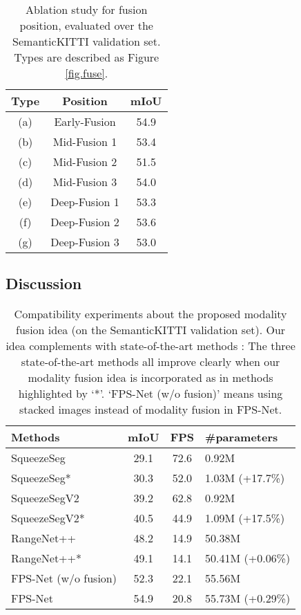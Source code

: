\documentclass[preprint,review,3p]{elsarticle}
\begin{document}
\renewcommand\arraystretch{1.0}
\begin{table}[!h]
  \caption{Ablation study for fusion position, evaluated over the SemanticKITTI validation set. Types are described as Figure \ref{fig.fuse}.} 
  \centering
  \begin{tabular}{ccc}
    \hline
    Type & Position  & mIoU\\
    \hline
    (a) & Early-Fusion & 54.9\\
    (b) & Mid-Fusion 1 & 53.4\\
    (c) & Mid-Fusion 2 & 51.5\\
    (d) & Mid-Fusion 3 & 54.0 \\
    (e) & Deep-Fusion 1 & 53.3\\
    (f) & Deep-Fusion 2 & 53.6\\
    (g) & Deep-Fusion 3 & 53.0 \\
    \hline
  \end{tabular}
  \label{tab.Ablation-fusion}
\end{table}

\subsection{Discussion}

\begin{table}[h]
  \caption{Compatibility experiments about the proposed modality fusion idea (on the SemanticKITTI validation set). Our idea complements with state-of-the-art methods : The three state-of-the-art methods all improve clearly when our modality fusion idea is incorporated as in methods highlighted by `*’. `FPS-Net (w/o fusion)' means using stacked images instead of modality fusion in FPS-Net.}
  \centering
  \begin{tabular}{lccl}
    \hline
    Methods & mIoU & FPS  & \#parameters\\
    \hline
    SqueezeSeg~\cite{wu2018squeezeseg}    & 29.1 & 72.6 & 0.92M \\
    SqueezeSeg* & 30.3 & 52.0 & 1.03M (+17.7\%)\\
    \hline
    SqueezeSegV2~\cite{wu2019squeezesegv2} & 39.2 & 62.8 & 0.92M\\
    SqueezeSegV2* & 40.5 & 44.9 & 1.09M (+17.5\%)\\
    \hline
    RangeNet++~\cite{milioto2019rangenet++} & 48.2 & 14.9 & 50.38M \\
    RangeNet++*   & 49.1 & 14.1 & 50.41M (+0.06\%)\\
    \hline
    FPS-Net (w/o fusion) & 52.3 & 22.1 & 55.56M \\
    FPS-Net  & 54.9 & 20.8 & 55.73M (+0.29\%)\\
    \hline
  \end{tabular}
  \label{tab.extend_model}
\end{table}
\end{document}
